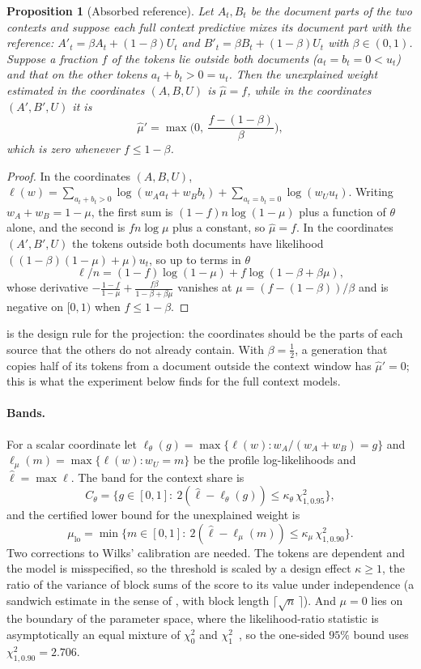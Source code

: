 \documentclass[11pt]{article}
\newtheorem{proposition}[theorem]{Proposition}
\theoremstyle{definition}
\theoremstyle{remark}
\begin{document}
\begin{proposition}[Absorbed reference]\label{prop:absorbed}
Let $A_t,B_t$ be the \emph{document parts} of the two contexts and suppose each full context
predictive mixes its document part with the reference: $A'_t=\beta A_t+(1-\beta)U_t$ and
$B'_t=\beta B_t+(1-\beta)U_t$ with $\beta\in(0,1)$. Suppose a fraction $f$ of the tokens lie outside
both documents ($a_t=b_t=0<u_t$) and that on the other tokens $a_t+b_t>0=u_t$. Then the unexplained weight
estimated in the coordinates $(A,B,U)$ is $\hat\mu=f$, while in the coordinates $(A',B',U)$ it is
\[
\hat\mu'=\max\Big(0,\ \frac{f-(1-\beta)}{\beta}\Big),
\]
which is zero whenever $f\le1-\beta$.
\end{proposition}
\begin{proof}
In the coordinates $(A,B,U)$, $\ell(w)=\sum_{a_t+b_t>0}\log(w_Aa_t+w_Bb_t)+\sum_{a_t=b_t=0}\log(w_Uu_t)$.
Writing $w_A+w_B=1-\mu$, the first sum is $(1-f)n\log(1-\mu)$ plus a function of $\theta$ alone, and
the second is $fn\log\mu$ plus a constant, so $\hat\mu=f$. In the coordinates $(A',B',U)$ the tokens
outside both documents have likelihood $((1-\beta)(1-\mu)+\mu)u_t$, so up to terms in $\theta$
\[
\ell/n=(1-f)\log(1-\mu)+f\log(1-\beta+\beta\mu),
\]
whose derivative $-\frac{1-f}{1-\mu}+\frac{f\beta}{1-\beta+\beta\mu}$ vanishes at
$\mu=(f-(1-\beta))/\beta$ and is negative on $[0,1)$ when $f\le1-\beta$.
\end{proof}

 is the design rule for the projection: the coordinates should be the parts of
each source that the others do not already contain. With $\beta=\tfrac12$, a generation that copies
half of its tokens from a document outside the context window has $\hat\mu'=0$; this is what the
experiment below finds for the full context models.

\paragraph{Bands.} For a scalar coordinate let $\ell_\theta(g)=\max\{\ell(w):w_A/(w_A+w_B)=g\}$ and
$\ell_\mu(m)=\max\{\ell(w):w_U=m\}$ be the profile log-likelihoods and $\hat\ell=\max\ell$. The band for
the context share is
\[
C_\theta=\{g\in[0,1]:\ 2(\hat\ell-\ell_\theta(g))\le\kappa_\theta\,\chi^2_{1,0.95}\},
\]
and the certified lower bound for the unexplained weight is
\[
\mu_{\mathrm{lo}}=\min\{m\in[0,1]:\ 2(\hat\ell-\ell_\mu(m))\le\kappa_\mu\,\chi^2_{1,0.90}\}.
\]
Two corrections to Wilks' calibration are needed. The tokens are dependent and the model is
misspecified, so the threshold is scaled by a design effect $\kappa\ge1$, the ratio of the variance
of block sums of the score to its value under independence (a sandwich estimate in the sense of
\cite{White1982}, with block length $\lceil\sqrt n\,\rceil$). And $\mu=0$ lies on the boundary of
the parameter space, where the likelihood-ratio statistic is asymptotically an equal mixture of
$\chi^2_0$ and $\chi^2_1$~\cite{Chernoff1954,SelfLiang1987}, so the one-sided $95\%$ bound uses
$\chi^2_{1,0.90}=2.706$.
\end{document}
